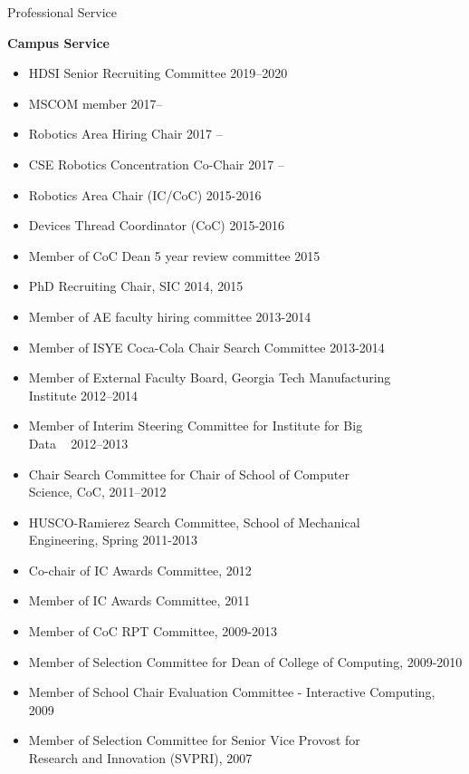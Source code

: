 \documentclass{article}
\begin{document}
\begin{cv}
\begin{cvlist}{Professional Service}
\item {\bf Campus Service}
  \begin{itemize}
  \item HDSI Senior Recruiting Committee  \cftdotfill{\cftdotsep} 2019--2020
  \item MSCOM member \cftdotfill{\cftdotsep} 2017--
  \item Robotics Area Hiring Chair \cftdotfill{\cftdotsep} 2017 --
  \item CSE Robotics Concentration Co-Chair \cftdotfill{\cftdotsep}
    2017 --
  \item Robotics Area Chair (IC/CoC) \cftdotfill{\cftdotsep} 2015-2016
  \item Devices Thread Coordinator (CoC) \cftdotfill{\cftdotsep} 2015-2016
  \item Member of CoC Dean 5 year review committee
    \cftdotfill{\cftdotsep} 2015
  \item PhD Recruiting Chair, SIC \cftdotfill{\cftdotsep} 2014, 2015
  \item Member of AE faculty hiring committee \cftdotfill{\cftdotsep}
    2013-2014
  \item Member of ISYE Coca-Cola Chair Search Committee
    \cftdotfill{\cftdotsep} 2013-2014
  \item Member of External Faculty Board, Georgia Tech Manufacturing\\
    Institute \cftdotfill{\cftdotsep} 2012--2014
  \item Member of Interim Steering Committee for Institute for Big
    \\Data ~ \cftdotfill{\cftdotsep} 2012--2013
  \item Chair Search Committee for Chair of School of Computer\\
    Science, CoC, \cftdotfill{\cftdotsep} 2011--2012
  \item HUSCO-Ramierez Search Committee, School of Mechanical\\
    Engineering, Spring \cftdotfill{\cftdotsep} 2011-2013
  \item Co-chair of IC Awards Committee, \cftdotfill{\cftdotsep} 2012
  \item Member of IC Awards Committee, \cftdotfill{\cftdotsep} 2011
  \item Member of CoC RPT Committee, \cftdotfill{\cftdotsep} 2009-2013
  \item Member of Selection Committee for Dean of College of
    Computing, \cftdotfill{\cftdotsep} 2009-2010
  \item Member of School Chair Evaluation Committee - Interactive
    Computing, \cftdotfill{\cftdotsep} 2009
  \item Member of Selection Committee for Senior Vice Provost for \\
    Research and Innovation (SVPRI), \cftdotfill{\cftdotsep} 2007
  \end{itemize}


\end{cvlist}
\end{cv}
\end{document}

